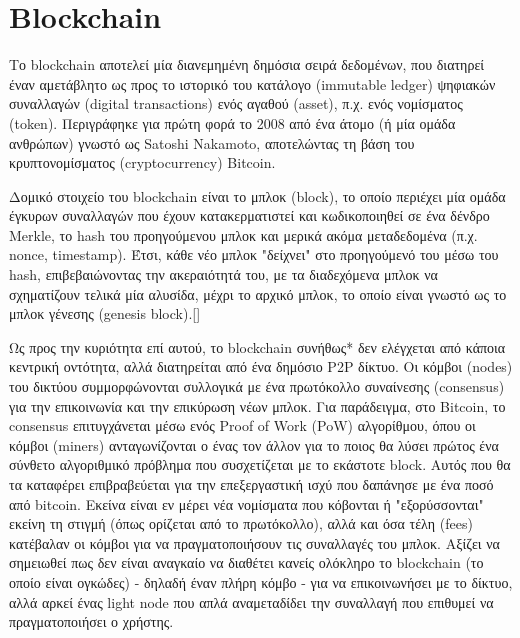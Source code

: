 \section{Blockchain}

Το blockchain αποτελεί μία διανεμημένη δημόσια σειρά δεδομένων, που διατηρεί έναν αμετάβλητο ως προς το ιστορικό του κατάλογο (immutable ledger) ψηφιακών συναλλαγών (digital transactions) ενός αγαθού (asset), π.χ. ενός νομίσματος (token). Περιγράφηκε για πρώτη φορά το 2008 από ένα άτομο (ή μία ομάδα ανθρώπων) γνωστό ως Satoshi Nakamoto, αποτελώντας τη βάση του κρυπτονομίσματος (cryptocurrency) Bitcoin.

Δομικό στοιχείο του blockchain είναι το μπλοκ (block), το οποίο περιέχει μία ομάδα έγκυρων συναλλαγών που έχουν κατακερματιστεί και κωδικοποιηθεί σε ένα δένδρο Merkle, το hash του προηγούμενου μπλοκ και μερικά ακόμα μεταδεδομένα (π.χ. nonce, timestamp). Έτσι, κάθε νέο μπλοκ "δείχνει" στο προηγούμενό του μέσω του hash, επιβεβαιώνοντας την ακεραιότητά του, με τα διαδεχόμενα μπλοκ να σχηματίζουν τελικά μία αλυσίδα, μέχρι το αρχικό μπλοκ, το οποίο είναι γνωστό ως το μπλοκ γένεσης (genesis block).[]

Ως προς την κυριότητα επί αυτού, το blockchain συνήθως* δεν ελέγχεται από κάποια κεντρική οντότητα, αλλά διατηρείται από ένα δημόσιο P2P δίκτυο. Οι κόμβοι (nodes) του δικτύου συμμορφώνονται συλλογικά με ένα πρωτόκολλο συναίνεσης (consensus) για την επικοινωνία και την επικύρωση νέων μπλοκ. Για παράδειγμα, στο Bitcoin, το consensus επιτυγχάνεται μέσω ενός Proof of Work (PoW) αλγορίθμου, όπου οι κόμβοι (miners) ανταγωνίζονται ο ένας τον άλλον για το ποιος θα λύσει πρώτος ένα σύνθετο αλγοριθμικό πρόβλημα που συσχετίζεται με το εκάστοτε block. Αυτός που θα τα καταφέρει επιβραβεύεται για την επεξεργαστική ισχύ που δαπάνησε με ένα ποσό από bitcoin. Εκείνα είναι εν μέρει νέα νομίσματα που κόβονται ή "εξορύσσονται" εκείνη τη στιγμή (όπως ορίζεται από το πρωτόκολλο), αλλά και όσα τέλη  (fees) κατέβαλαν οι κόμβοι για να πραγματοποιήσουν τις συναλλαγές του μπλοκ. Αξίζει να σημειωθεί πως δεν είναι αναγκαίο να διαθέτει κανείς ολόκληρο το blockchain (το οποίο είναι ογκώδες) - δηλαδή έναν πλήρη κόμβο - για να επικοινωνήσει με το δίκτυο, αλλά αρκεί ένας light node που απλά αναμεταδίδει την συναλλαγή που επιθυμεί να πραγματοποιήσει ο χρήστης.

